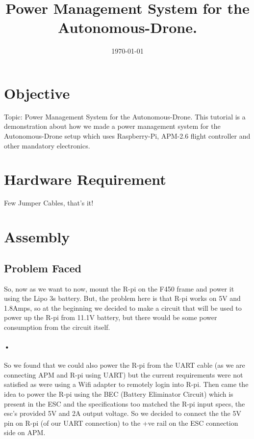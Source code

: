 \documentclass[11pt,a4paper]{article}
\title{Power Management System for the Autonomous-Drone.}
\author{}
\date{\today}
\begin{document}
	\maketitle
	\newpage
	\tableofcontents
	\newpage
	\section{Objective}
	Topic: Power Management System for the Autonomous-Drone.
		This tutorial is a demonstration about how we made a power management system for the Autonomous-Drone setup which uses Raspberry-Pi, APM-2.6 flight controller and other mandatory electronics.
	\section{Hardware Requirement}
	 Few Jumper Cables, that's it!
	\section{Assembly}
	\subsection{Problem Faced}
	 So, now as we want to now, mount the R-pi on the F450 frame and power it using the Lipo 3s battery. But, the problem here is that R-pi works on 5V and 1.8Amps, so at the beginning we decided to make a circuit that will be used to power up the R-pi from 11.1V battery, but there would be some power consumption from the circuit itself.\paragraph{•} So we found that we could also power the R-pi from the UART cable (as we are connecting APM and R-pi using UART) but the current requirements were not satisfied as were using a Wifi adapter to remotely login into R-pi. Then came the idea to power the R-pi using the BEC (Battery Eliminator Circuit) which is present in the ESC and the specifications too matched the R-pi input specs, the esc's provided 5V and 2A output voltage. So we decided to connect the the 5V pin on R-pi (of our UART connection) to the +ve rail on the ESC connection side on APM.
\end{document}
